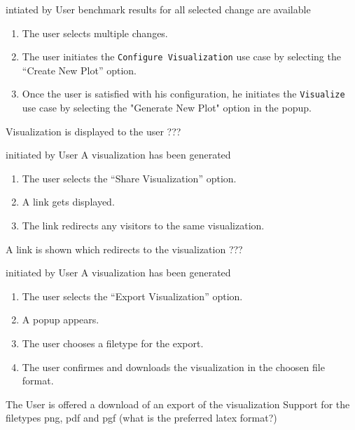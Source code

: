 \bigskip

{intiated by User}
{benchmark results for all selected change are available}
{\begin{enumerate}
    \item The user selects multiple changes.
    \item The user initiates the \texttt{Configure Visualization} use case by selecting the \enquote{Create New Plot} option.
    \item Once the user is satisfied with his \gls{configuration}, he initiates the \texttt{Visualize} use case by selecting the "Generate New Plot" option in the popup.
\end{enumerate}}
{Visualization is displayed to the user}
{???}

\bigskip

{initiated by User}
{A \gls{visualization} has been generated}
{\begin{enumerate}
    \item The user selects the \enquote{Share Visualization} option.
    \item A link gets displayed.
    \item The link redirects any visitors to the same \gls{visualization}.
\end{enumerate}} 
{A link is shown which redirects to the \gls{visualization}}
{???}

\bigskip

{initiated by User}
{A \gls{visualization} has been generated}
{\begin{enumerate}
    \item The user selects the \enquote{Export Visualization} option.
    \item A popup appears.
    \item The user chooses a filetype for the export.
    \item The user confirmes and downloads the \gls{visualization} in the choosen file format.
\end{enumerate}} 
{The User is offered a download of an export of the \gls{visualization}}
{Support for the filetypes png, pdf and pgf (what is the preferred latex format?)}

\bigskip

